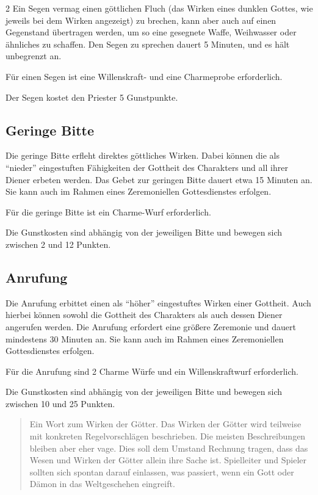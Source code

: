 \begin{multicols}{2}
Ein Segen vermag einen göttlichen Fluch (das Wirken eines dunklen Gottes, wie jeweils bei dem Wirken angezeigt) zu brechen, kann aber auch auf einen Gegenstand übertragen werden, um so eine gesegnete Waffe, Weihwasser oder ähnliches zu schaffen. Den Segen zu sprechen dauert 5 Minuten, und es hält unbegrenzt an.

Für einen Segen ist eine Willenskraft- und eine Charmeprobe erforderlich.

Der Segen kostet den Priester 5 Gunstpunkte.

\subsection{Geringe Bitte}

Die geringe Bitte erfleht direktes göttliches Wirken. Dabei können die als ``nieder'' eingestuften Fähigkeiten der Gottheit des Charakters und all ihrer Diener erbeten werden. Das Gebet zur geringen Bitte dauert etwa 15 Minuten an. Sie kann auch im Rahmen eines Zeremoniellen Gottesdienstes erfolgen.

Für die geringe Bitte ist ein Charme-Wurf erforderlich.

Die Gunstkosten sind abhängig von der jeweiligen Bitte und bewegen sich zwischen 2 und 12 Punkten.

\subsection{Anrufung}

Die Anrufung erbittet einen als ``höher'' eingestuftes Wirken einer Gottheit. Auch hierbei können sowohl die Gottheit des Charakters als auch dessen Diener angerufen werden. Die Anrufung erfordert eine größere Zeremonie und dauert mindestens 30 Minuten an. Sie kann auch im Rahmen eines Zeremoniellen Gottesdienstes erfolgen.

Für die Anrufung sind 2 Charme Würfe und ein Willenskraftwurf erforderlich.

Die Gunstkosten sind abhängig von der jeweiligen Bitte und bewegen sich zwischen 10 und 25 Punkten.

\begin{quote}
Ein Wort zum Wirken der Götter. Das Wirken der Götter wird teilweise mit konkreten Regelvorschlägen beschrieben. Die meisten Beschreibungen bleiben aber eher vage. Dies soll dem Umstand Rechnung tragen, dass das Wesen und Wirken der Götter allein ihre Sache ist. Spielleiter und Spieler sollten sich spontan darauf einlassen, was passiert, wenn ein Gott oder Dämon in das Weltgeschehen eingreift.
\end{quote}


\end{multicols}
